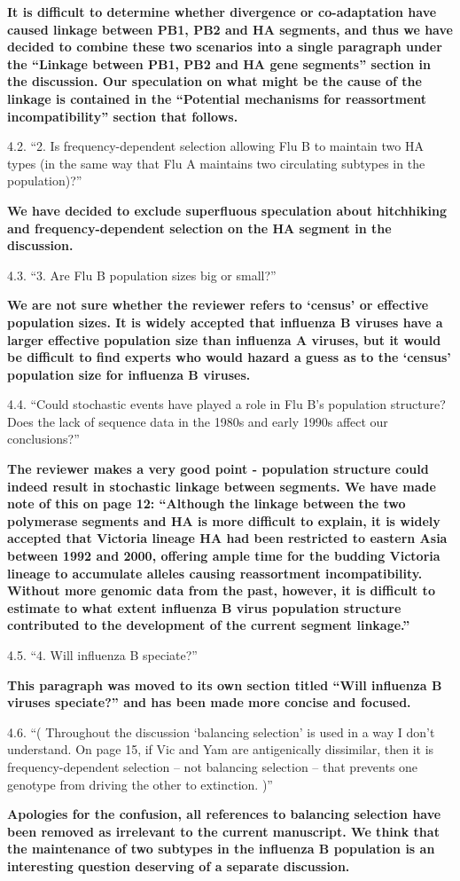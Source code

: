 \documentclass[11pt,oneside,letterpaper]{article}
\begin{document}
\textbf{It is difficult to determine whether divergence or co-adaptation have caused linkage between PB1, PB2 and HA segments, and thus we have decided to combine these two scenarios into a single paragraph under the ``Linkage between PB1, PB2 and HA gene segments'' section in the discussion.
Our speculation on what might be the cause of the linkage is contained in the ``Potential mechanisms for reassortment incompatibility'' section that follows.}

4.2. ``2. Is frequency-dependent selection allowing Flu B to maintain two HA types (in the same way that Flu A maintains two circulating subtypes in the population)?''

\textbf{We have decided to exclude superfluous speculation about hitchhiking and frequency-dependent selection on the HA segment in the discussion.}

4.3. ``3. Are Flu B population sizes big or small?''

\textbf{We are not sure whether the reviewer refers to `census' or effective population sizes.
It is widely accepted that influenza B viruses have a larger effective population size than influenza A viruses, but it would be difficult to find experts who would hazard a guess as to the `census' population size for influenza B viruses.}

4.4. ``Could stochastic events have played a role in Flu B's population structure?
Does the lack of sequence data in the 1980s and early 1990s affect our conclusions?''

\textbf{The reviewer makes a very good point - population structure could indeed result in stochastic linkage between segments.
We have made note of this on page 12:
``Although the linkage between the two polymerase segments and HA is more difficult to explain, it is widely accepted that Victoria lineage HA had been restricted to eastern Asia between 1992 and 2000, offering ample time for the budding Victoria lineage to accumulate alleles causing reassortment incompatibility.
Without more genomic data from the past, however, it is difficult to estimate to what extent influenza B virus population structure contributed to the development of the current segment linkage.''}

4.5. ``4. Will influenza B speciate?''

\textbf{This paragraph was moved to its own section titled ``Will influenza B viruses speciate?'' and has been made more concise and focused.}

4.6. ``( Throughout the discussion `balancing selection' is used in a way I don't understand.
On page 15, if Vic and Yam are antigenically dissimilar, then it is frequency-dependent selection -- not balancing selection -- that prevents one genotype from driving the other to extinction. )''

\textbf{Apologies for the confusion, all references to balancing selection have been removed as irrelevant to the current manuscript.
We think that the maintenance of two subtypes in the influenza B population is an interesting question deserving of a separate discussion.}
\end{document}

